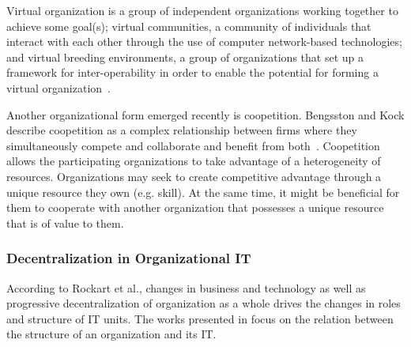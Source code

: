 Virtual organization is a group of independent organizations working together to achieve some goal(s); virtual communities, a community of individuals that interact with each other through the use of computer network-based technologies; and virtual breeding environments, a group of organizations that set up a framework for inter-operability in order to enable the potential for forming a virtual organization~\cite{Camarinha-Matos2005}.


Another organizational form emerged recently is coopetition. Bengsston and Kock describe coopetition as a complex relationship between firms where they simultaneously compete and collaborate and benefit from both~\cite{Bengtsson2000}. Coopetition allows the participating organizations to take advantage of a heterogeneity of resources. Organizations may seek to create competitive advantage through a unique resource they own (e.g. skill). At the same time, it might be beneficial for them to cooperate with another organization that possesses a unique resource that is of value to them. 





\subsubsection{Decentralization in Organizational IT}
According to Rockart et al.\cite{Rockart1996}, changes in business and technology as well as progressive decentralization of organization as a whole drives the changes in roles and structure  of IT units. The works presented in \cite{fulk1995, osterloh2000, Rockart1996, Weill2004} focus on the relation between the structure of an organization and its IT. 

